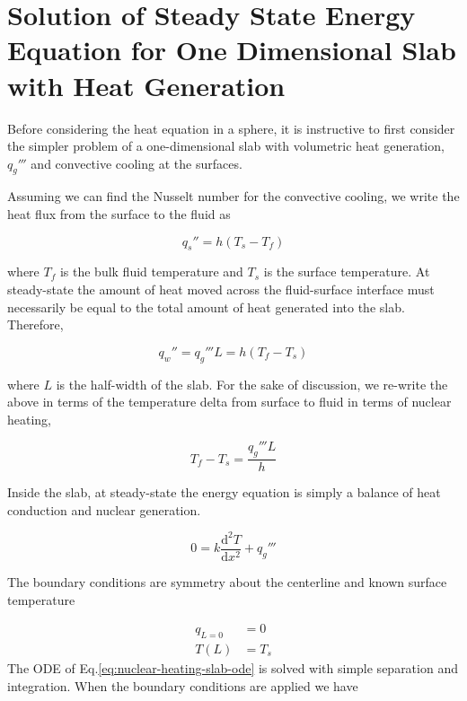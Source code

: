 \chapter{Solution of Steady State Energy Equation for One Dimensional Slab with Heat Generation}\label{sec:analytic-slab}

Before considering the heat equation in a sphere, it is instructive to first consider the simpler problem of a one-dimensional slab with volumetric heat generation, $q_g'''$ and convective cooling at the surfaces.

Assuming we can find the Nusselt number for the convective cooling, we write the heat flux from the surface to the fluid as

\begin{equation}
	q_s'' = h(T_s - T_f)	
\end{equation}

where $T_f$ is the bulk fluid temperature and $T_s$ is the surface temperature. At steady-state the amount of heat moved across the fluid-surface interface must necessarily be equal to the total amount of heat generated into the slab. Therefore,

\begin{equation}
	q_w'' = q_g'''L = h(T_f-T_s)
\end{equation}

where $L$ is the half-width of the slab. For the sake of discussion, we re-write the above in terms of the temperature delta from surface to fluid in terms of nuclear heating,

\begin{equation}\label{eq:fluid-delta}
	T_f-T_s = \frac{q_g'''L}{h}
\end{equation}

Inside the slab, at steady-state the energy equation is simply a balance of heat conduction and nuclear generation. 

\begin{equation}\label{eq:nuclear-heating-slab-ode}
	0 = k\frac{\mathrm{d}^2T}{\mathrm{d}x^2} + q_g'''
\end{equation}

The boundary conditions are symmetry about the centerline and known surface temperature

\begin{subequations}
\begin{align}
	q_{L=0} &= 0 \\
	T(L) &= T_s
\end{align}
\end{subequations}
The ODE of Eq.\ref{eq:nuclear-heating-slab-ode} is solved with simple separation and integration. When the boundary conditions are applied we have

